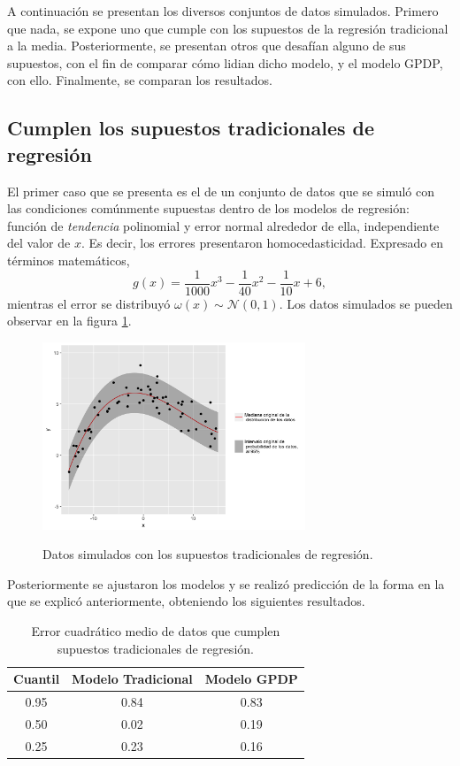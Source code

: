 A continuaci\'on se presentan los diversos conjuntos de datos simulados. Primero que nada, se expone uno que cumple con los supuestos de la regresi\'on tradicional a la media. Posteriormente, se presentan otros que desaf\'ian alguno de sus supuestos, con el fin de comparar c\'omo lidian dicho modelo, y el modelo GPDP, con ello. Finalmente, se comparan los resultados.

\subsection{Cumplen los supuestos tradicionales de regresi\'on}

El primer caso que se presenta es el de un conjunto de datos que se simul\'o con las condiciones com\'unmente supuestas dentro de los modelos de regresi\'on: funci\'on de \textit{tendencia} polinomial y error normal alrededor de ella, independiente del valor de $x$. Es decir, los errores presentaron homocedasticidad. Expresado en t\'erminos matem\'aticos,
\begin{equation*}
    g(x) = \frac{1}{1000}x^3 - \frac{1}{40}x^2 - \frac{1}{10}x + 6,
\end{equation*}
mientras el error se distribuy\'o $\omega(x) \sim \mathcal{N}(0,1)$. Los datos simulados se pueden observar en la figura \ref{sample_classic}.

\begin{figure}[H]
	\centering
	\caption{Datos simulados con los supuestos tradicionales de regresi\'on.}
	\includegraphics[width=0.7\textwidth]{Figures/Simulation/classic/sample.png}
	\label{sample_classic}
\end{figure}

Posteriormente se ajustaron los modelos y se realiz\'o predicci\'on de la forma en la que se explic\'o anteriormente, obteniendo los siguientes resultados.

\begin{table}[H]
\centering
\caption{Error cuadrático medio de datos que cumplen supuestos tradicionales de regresi\'on.} 
\begin{tabular}{ccc}
  \hline
Cuantil & Modelo Tradicional & Modelo GPDP \\ 
  \hline
0.95 & 0.84 & 0.83 \\ 
  0.50 & 0.02 & 0.19 \\ 
  0.25 & 0.23 & 0.16 \\ 
   \hline
\end{tabular}
\label{mse_classic}
\end{table}


